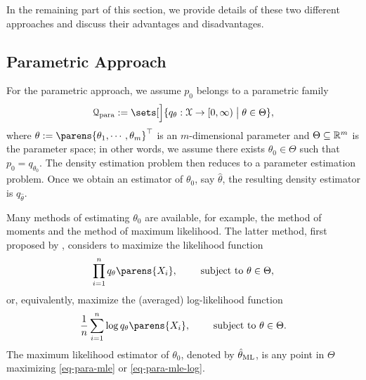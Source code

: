 In the remaining part of this section, we provide details of these two different approaches and discuss their advantages and disadvantages. 

\subsection{Parametric Approach}\label{subsection-parametric-density-estimation}

For the parametric approach, we assume $p_0$ belongs to a parametric family 
\begin{align*} %
	\calQ_{\mathrm{para}} := \sets[\Big]{q_{\theta}: \calX \to [0, \infty) \bigm| \theta \in \Theta}, 
\end{align*}
where $\theta := \parens{\theta_1, \cdots, \theta_m}^\top$ is an $m$-dimensional parameter and $\Theta \subseteq \mathbb{R}^m$ is the parameter space; in other words, we assume there exists $\theta_0 \in \Theta$ such that $p_0 = q_{\theta_0}$. The density estimation problem then reduces to a parameter estimation problem. Once we obtain an estimator of $\theta_0$, say $\hat{\theta}$, the resulting density estimator is $q_{\hat{\theta}}$. 

Many methods of estimating $\theta_0$ are available, for example, the method of moments and the method of maximum likelihood. 
The latter method, first proposed by \textcites{Fisher1922-qi}, considers to maximize the likelihood function
\begin{align}\label{eq-para-mle}
	\prod_{i=1}^n q_{\theta} \parens{X_i}, \qquad \text{ subject to } \theta \in \Theta, 
\end{align}
or, equivalently, maximize the (averaged) log-likelihood function
\begin{align}\label{eq-para-mle-log}
	\frac{1}{n} \sum_{i=1}^n \log q_{\theta} \parens{X_i}, \qquad \text{ subject to } \theta \in \Theta. 
\end{align}
The maximum likelihood estimator of $\theta_0$, denoted by $\hat{\theta}_{\mathrm{ML}}$, is any point in $\Theta$ maximizing \eqref{eq-para-mle} or \eqref{eq-para-mle-log}. 

